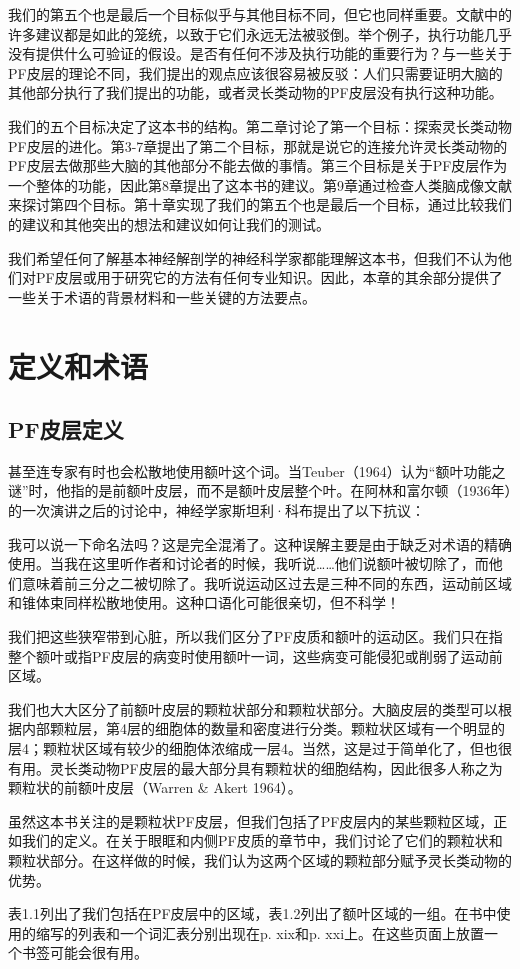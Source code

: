 我们的第五个也是最后一个目标似乎与其他目标不同，但它也同样重要。文献中的许多建议都是如此的笼统，以致于它们永远无法被驳倒。举个例子，执行功能几乎没有提供什么可验证的假设。是否有任何不涉及执行功能的重要行为？与一些关于PF皮层的理论不同，我们提出的观点应该很容易被反驳：人们只需要证明大脑的其他部分执行了我们提出的功能，或者灵长类动物的PF皮层没有执行这种功能。
\par
我们的五个目标决定了这本书的结构。第二章讨论了第一个目标：探索灵长类动物PF皮层的进化。第3-7章提出了第二个目标，那就是说它的连接允许灵长类动物的PF皮层去做那些大脑的其他部分不能去做的事情。第三个目标是关于PF皮层作为一个整体的功能，因此第8章提出了这本书的建议。第9章通过检查人类脑成像文献来探讨第四个目标。第十章实现了我们的第五个也是最后一个目标，通过比较我们的建议和其他突出的想法和建议如何让我们的测试。
\par
我们希望任何了解基本神经解剖学的神经科学家都能理解这本书，但我们不认为他们对PF皮层或用于研究它的方法有任何专业知识。因此，本章的其余部分提供了一些关于术语的背景材料和一些关键的方法要点。



\section{定义和术语}
\subsection{PF皮层定义}
甚至连专家有时也会松散地使用额叶这个词。当Teuber（1964）认为“额叶功能之谜”时，他指的是前额叶皮层，而不是额叶皮层整个叶。在阿林和富尔顿（1936年）的一次演讲之后的讨论中，神经学家斯坦利·科布提出了以下抗议：
\par
我可以说一下命名法吗？这是完全混淆了。这种误解主要是由于缺乏对术语的精确使用。当我在这里听作者和讨论者的时候，我听说……他们说额叶被切除了，而他们意味着前三分之二被切除了。我听说运动区过去是三种不同的东西，运动前区域和锥体束同样松散地使用。这种口语化可能很亲切，但不科学！
\par
我们把这些狭窄带到心脏，所以我们区分了PF皮质和额叶的运动区。我们只在指整个额叶或指PF皮层的病变时使用额叶一词，这些病变可能侵犯或削弱了运动前区域。
\par
我们也大大区分了前额叶皮层的颗粒状部分和颗粒状部分。大脑皮层的类型可以根据内部颗粒层，第4层的细胞体的数量和密度进行分类。颗粒状区域有一个明显的层4；颗粒状区域有较少的细胞体浓缩成一层4。当然，这是过于简单化了，但也很有用。灵长类动物PF皮层的最大部分具有颗粒状的细胞结构，因此很多人称之为颗粒状的前额叶皮层（Warren & Akert 1964）。
\par
虽然这本书关注的是颗粒状PF皮层，但我们包括了PF皮层内的某些颗粒区域，正如我们的定义。在关于眼眶和内侧PF皮质的章节中，我们讨论了它们的颗粒状和颗粒状部分。在这样做的时候，我们认为这两个区域的颗粒部分赋予灵长类动物的优势。
\par
表1.1列出了我们包括在PF皮层中的区域，表1.2列出了额叶区域的一组。在书中使用的缩写的列表和一个词汇表分别出现在p. xix和p. xxi上。在这些页面上放置一个书签可能会很有用。
